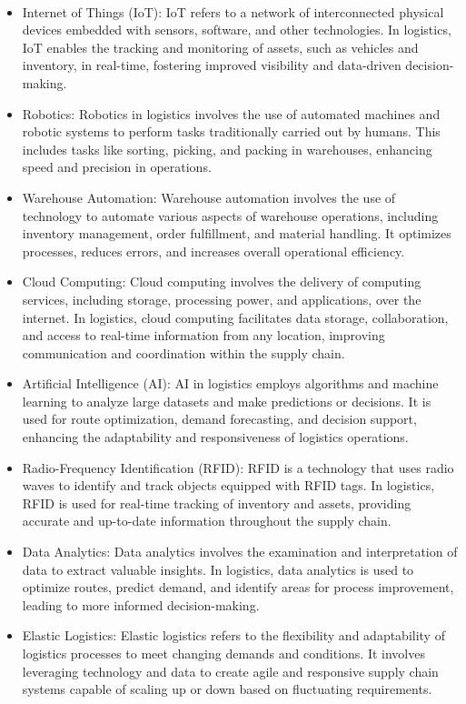 \documentclass{report}
\begin{document}
\\
\begin{itemize}
  \item{Internet of Things (IoT): IoT refers to a network of interconnected physical devices embedded with sensors, software, and other technologies. In logistics, IoT enables the tracking and monitoring of assets, such as vehicles and inventory, in real-time, fostering improved visibility and data-driven decision-making.}
  \item{Robotics: Robotics in logistics involves the use of automated machines and robotic systems to perform tasks traditionally carried out by humans. This includes tasks like sorting, picking, and packing in warehouses, enhancing speed and precision in operations.}
  \item{Warehouse Automation: Warehouse automation involves the use of technology to automate various aspects of warehouse operations, including inventory management, order fulfillment, and material handling. It optimizes processes, reduces errors, and increases overall operational efficiency.}
  \item{Cloud Computing: Cloud computing involves the delivery of computing services, including storage, processing power, and applications, over the internet. In logistics, cloud computing facilitates data storage, collaboration, and access to real-time information from any location, improving communication and coordination within the supply chain.}
  \item{Artificial Intelligence (AI): AI in logistics employs algorithms and machine learning to analyze large datasets and make predictions or decisions. It is used for route optimization, demand forecasting, and decision support, enhancing the adaptability and responsiveness of logistics operations.}
  \item{Radio-Frequency Identification (RFID): RFID is a technology that uses radio waves to identify and track objects equipped with RFID tags. In logistics, RFID is used for real-time tracking of inventory and assets, providing accurate and up-to-date information throughout the supply chain.}
  \item{Data Analytics: Data analytics involves the examination and interpretation of data to extract valuable insights. In logistics, data analytics is used to optimize routes, predict demand, and identify areas for process improvement, leading to more informed decision-making.}
  \item{Elastic Logistics: Elastic logistics refers to the flexibility and adaptability of logistics processes to meet changing demands and conditions. It involves leveraging technology and data to create agile and responsive supply chain systems capable of scaling up or down based on fluctuating requirements.}
\end{itemize}
\end{document}
